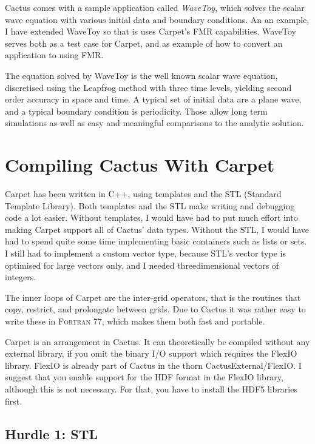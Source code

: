 Cactus comes with a sample application called \emph{WaveToy}, which
solves the scalar wave equation with various initial data and boundary
conditions.  An an example, I have extended WaveToy so that is uses
Carpet's FMR capabilities.  WaveToy serves both as a test case for
Carpet, and as example of how to convert an application to using FMR.

The equation solved by WaveToy is the well known scalar wave equation,
discretised using the Leapfrog method with three time levels, yielding
second order accuracy in space and time.  A typical set of initial
data are a plane wave, and a typical boundary condition is
periodicity.  Those allow long term simulations as well as easy and
meaningful comparisons to the analytic solution.



\section{Compiling Cactus With Carpet}

Carpet has been written in C++, using templates and the STL (Standard
Template Library).  Both templates and the STL make writing and
debugging code a lot easier.  Without templates, I would have had to
put much effort into making Carpet support all of Cactus' data types.
Without the STL, I would have had to spend quite some time
implementing basic containers such as lists or sets.  I still had to
implement a custom vector type, because STL's vector type is optimised
for large vectors only, and I needed threedimensional vectors of
integers.

The inner loops of Carpet are the inter-grid operators, that is the
routines that copy, restrict, and prolongate between grids.  Due to
Cactus it was rather easy to write these in \textsc{Fortran 77}, which
makes them both fast and portable.

Carpet is an arrangement in Cactus.  It can theoretically be compiled
without any external library, if you omit the binary I/O support which
requires the FlexIO library.  FlexIO is already part of Cactus in the
thorn CactusExternal/FlexIO.  I suggest that you enable support for
the HDF format in the FlexIO library, although this is not necessary.
For that, you have to install the HDF5 libraries first.

\subsection{Hurdle 1: STL}


